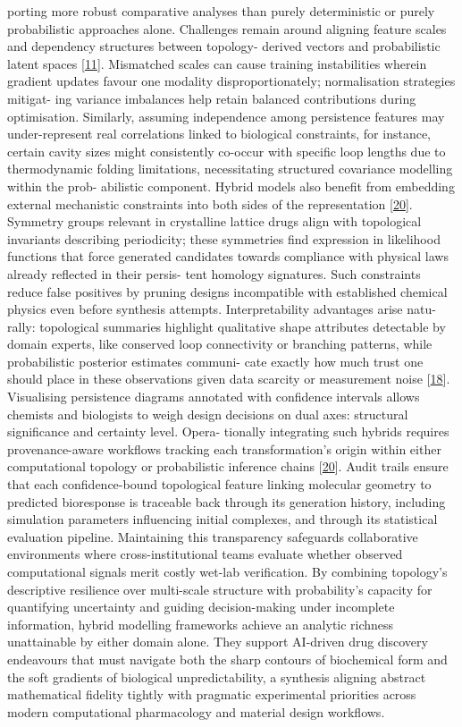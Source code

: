 \documentclass[
]{article}
\begin{document}
porting more robust comparative analyses than purely deterministic or
purely probabilistic approaches alone. Challenges remain around aligning
feature scales and dependency structures between topology- derived
vectors and probabilistic latent spaces
{[}\protect\hyperlink{_bookmark51}{11}{]}. Mismatched scales can cause
training instabilities wherein gradient updates favour one modality
disproportionately; normalisation strategies mitigat- ing variance
imbalances help retain balanced contributions during optimisation.
Similarly, assuming independence among persistence features may
under-represent real correlations linked to biological constraints, for
instance, certain cavity sizes might consistently co-occur with specific
loop lengths due to thermodynamic folding limitations, necessitating
structured covariance modelling within the prob- abilistic component.
Hybrid models also benefit from embedding external mechanistic
constraints into both sides of the representation
{[}\protect\hyperlink{_bookmark60}{20}{]}. Symmetry groups relevant in
crystalline lattice drugs align with topological invariants describing
periodicity; these symmetries find expression in likelihood functions
that force generated candidates towards compliance with physical laws
already reflected in their persis- tent homology signatures. Such
constraints reduce false positives by pruning designs incompatible with
established chemical physics even before synthesis attempts.
Interpretability advantages arise natu- rally: topological summaries
highlight qualitative shape attributes detectable by domain experts,
like conserved loop connectivity or branching patterns, while
probabilistic posterior estimates communi- cate exactly how much trust
one should place in these observations given data scarcity or
measurement noise {[}\protect\hyperlink{_bookmark58}{18}{]}. Visualising
persistence diagrams annotated with confidence intervals allows chemists
and biologists to weigh design decisions on dual axes: structural
significance and certainty level. Opera- tionally integrating such
hybrids requires provenance-aware workflows tracking each
transformation's origin within either computational topology or
probabilistic inference chains
{[}\protect\hyperlink{_bookmark60}{20}{]}. Audit trails ensure that each
confidence-bound topological feature linking molecular geometry to
predicted bioresponse is traceable back through its generation history,
including simulation parameters influencing initial complexes, and
through its statistical evaluation pipeline. Maintaining this
transparency safeguards collaborative environments where
cross-institutional teams evaluate whether observed computational
signals merit costly wet-lab verification. By combining topology's
descriptive resilience over multi-scale structure with probability's
capacity for quantifying uncertainty and guiding decision-making under
incomplete information, hybrid modelling frameworks achieve an analytic
richness unattainable by either domain alone. They support AI-driven
drug discovery endeavours that must navigate both the sharp contours of
biochemical form and the soft gradients of biological unpredictability,
a synthesis aligning abstract mathematical fidelity tightly with
pragmatic experimental priorities across modern computational
pharmacology and material design workflows.
\end{document}
